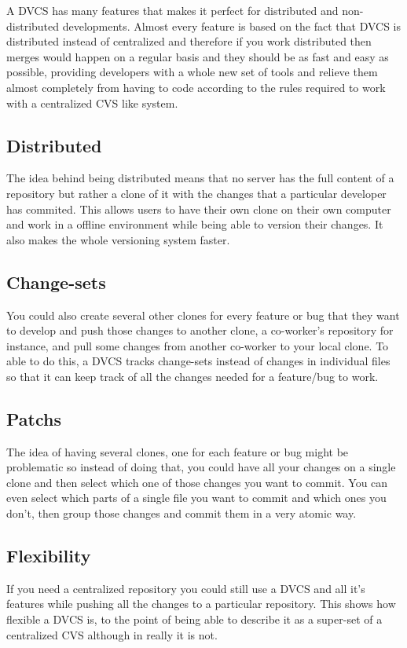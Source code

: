 \documentclass[%
	final,
	notitlepage,
	narroweqnarray,
	inline,
	twoside,
	]{ieee}
\begin{document}
A DVCS has many features that makes it perfect for distributed and non-distributed developments. Almost every feature is based on the fact that DVCS is distributed instead of centralized and therefore if you work distributed then merges would happen on a regular basis and they should be as fast and easy as possible, providing developers with a whole new set of tools and relieve them almost completely from having to code according to the rules required to work with a centralized CVS like system. 

\subsection{Distributed}
The idea behind being distributed means that no server has the full content of a repository but rather a clone of it with the changes that a particular developer has commited. This allows users to have their own clone on their own computer and work in a offline environment while being able to version their changes. It also makes the whole versioning system faster.

\subsection{Change-sets}
You could also create several other clones for every feature or bug that they want to develop and push those changes to another clone, a co-worker's repository for instance, and pull some changes from another co-worker to your local clone. To able to do this, a DVCS tracks change-sets instead of changes in individual files so that it can keep track of all the changes needed for a feature/bug to work. 

\subsection{Patchs}
The idea of having several clones, one for each feature or bug might be problematic so instead of doing that, you could have all your changes on a single clone and then select which one of those changes you want to commit. You can even select which parts of a single file you want to commit and which ones you don't, then group those changes and commit them in a very atomic way.

\subsection{Flexibility}
If you need a centralized repository you could still use a DVCS and all it's features while pushing all the changes to a particular repository. This shows how flexible a DVCS is, to the point of being able to describe it as a super-set of a centralized CVS although in really it is not.
\end{document}
